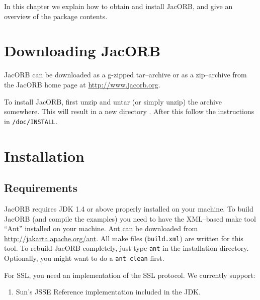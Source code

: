 
In this chapter  we explain how to obtain and  install JacORB, and give
an overview of the package contents.

\section{Downloading JacORB}


JacORB can be downloaded as a g-zipped tar--archive or as a zip--archive
from the  JacORB home page  at
\href{http://www.jacorb.org}{http://www.jacorb.org}.

To install JacORB, first unzip  and untar (or simply unzip) the archive
somewhere.  This will result  in a new directory {\tt \JacORBDir}.
After this follow the instructions in {\tt \JacORBDir/doc/INSTALL}.

\section{Installation}
\label{Sec_installation}

\subsection{Requirements}

JacORB requires JDK 1.4 or above properly installed on your machine.  To build
JacORB (and compile the examples) you need to have the XML--based make tool
``Ant'' installed on your machine.  Ant can be downloaded from
\href{http://jakarta.apache.org/ant}{http://jakarta.apache.org/ant}. All make
files ({\tt build.xml}) are written for this tool. To rebuild JacORB
completely, just type {\tt ant} in the installation directory.  Optionally,
you might want to do a {\tt ant clean} first.

For SSL, you need an implementation of the SSL protocol. We currently support:

\begin{enumerate}
\item Sun's JSSE Reference implementation included in the JDK.
\end{enumerate}


